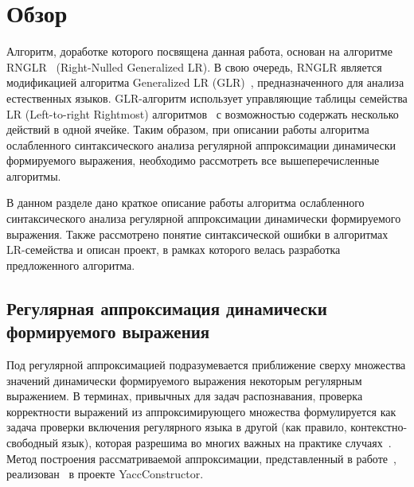 
\section{Обзор}
Алгоритм, доработке которого посвящена данная работа, основан на алгоритме RNGLR~\cite{RNGLR} (Right-Nulled Generalized LR). В свою очередь, RNGLR является модификацией алгоритма Generalized LR (GLR)~\cite{Tomita}, предназначенного для анализа естественных языков. GLR-алгоритм использует управляющие таблицы семейства LR (Left-to-right Rightmost) алгоритмов~\cite{Grune} с возможностью содержать несколько действий в одной ячейке. Таким образом, при описании работы алгоритма ослабленного синтаксического анализа регулярной аппроксимации динамически формируемого выражения, необходимо рассмотреть все вышеперечисленные алгоритмы.

В данном разделе дано краткое описание работы алгоритма ослабленного синтаксического анализа регулярной аппроксимации динамически формируемого выражения. Также рассмотрено понятие синтаксической ошибки в алгоритмах LR-семейства и описан проект, в рамках которого велась разработка предложенного алгоритма.

\subsection{Регулярная аппроксимация динамически формируемого выражения}
Под регулярной аппроксимацией подразумевается приближение сверху множества значений динамически формируемого выражения некоторым регулярным выражением. В терминах, привычных для задач распознавания, проверка корректности выражений из аппроксимирующего множества формулируется как задача проверки включения регулярного языка в другой (как правило, контекстно-свободный язык), которая разрешима во многих важных на практике случаях~\cite{LangInclusion}. Метод построения рассматриваемой аппроксимации, представленный в работе~\cite{RegOverApprox}, реализован~\cite{YCregapprox} в проекте YaccConstructor.

